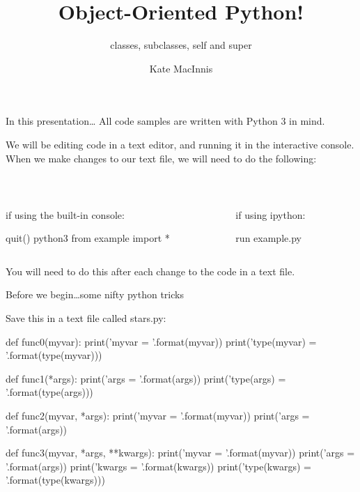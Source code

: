 \documentclass[aspectratio=149] {beamer}
\title[OOP!]{Object-Oriented Python!}
\subtitle{classes, subclasses, self and super}
\author{Kate MacInnis}
\institute{PyLadies-ATX Tech Talk\\June 4, 2015}
\date{}
\begin{document}
\begin{frame}
\titlepage
\end{frame}


\begin{frame}[fragile]{In this presentation\dots}
  All code samples are written with Python 3 in mind.
  
  \bigskip
  
  
  We will be editing code in a text editor, and running it in the interactive console. When we make changes to our text file, we will need to do the following:
  
  ~\hfill
  \begin{columns}
    \begin{column}[t]{.4\textwidth}
      {\small if using the built-in console:}
      \begin{codeblock}
        quit()
        python3
        from example import *
      \end{codeblock}
    \end{column}
   
    \begin{column}[t]{.4\textwidth}
      {\small if using ipython:}
      \begin{codeblock}
        run example.py
      \end{codeblock}
    \end{column}
  \end{columns}
  
  \bigskip
  
  
  You will need to do this after each change to the code in a text file.
  
  
\end{frame}



\begin{frame}[fragile]{Before we begin\dots some nifty python tricks}

  Save this in a text file called stars.py:
  
  \begin{smallpythoncode}
    def func0(myvar):
        print('myvar = {}'.format(myvar))
        print('type(myvar) = {}'.format(type(myvar)))
    
    def func1(*args):
        print('args = {}'.format(args))
        print('type(args) = {}'.format(type(args)))
    
    def func2(myvar, *args):
        print('myvar = {}'.format(myvar))
        print('args = {}'.format(args))
    
    def func3(myvar, *args, **kwargs):
        print('myvar = {}'.format(myvar))
        print('args = {}'.format(args))
        print('kwargs = {}'.format(kwargs))
        print('type(kwargs) = {}'.format(type(kwargs)))
  \end{smallpythoncode}


\end{frame}
\end{document}
